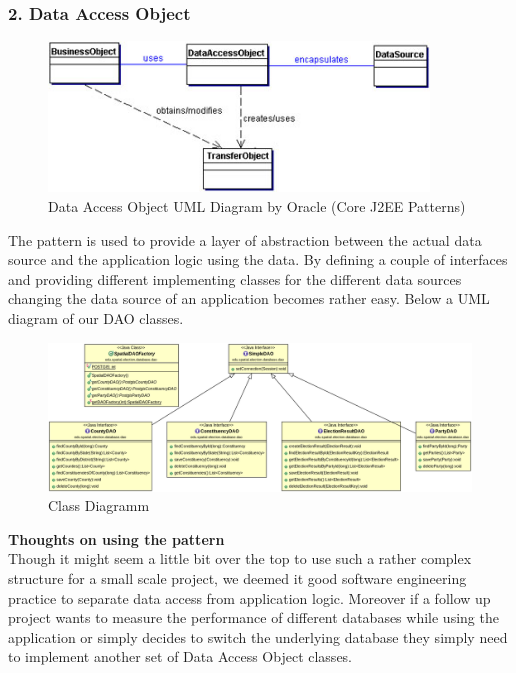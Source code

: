 \subsubsection{2. Data Access Object}\label{data-access-object}

\begin{figure}[htbp]
\centering
\includegraphics[width=0.9\textwidth]{../img/146804.jpg}
\caption{Data Access Object UML Diagram by Oracle (Core J2EE Patterns)}
\end{figure}

The pattern is used to provide a layer of abstraction between the actual
data source and the application logic using the data. By defining a
couple of interfaces and providing different implementing classes for
the different data sources changing the data source of an application
becomes rather easy. Below a UML diagram of our DAO classes.

\begin{figure}[htbp]
\centering
\includegraphics[width=1.2\textwidth]{../img/6CeJf06.png}
\caption{Class Diagramm}
\end{figure}

\textbf{Thoughts on using the pattern}\\Though it might seem a little
bit over the top to use such a rather complex structure for a small
scale project, we deemed it good software engineering practice to
separate data access from application logic. Moreover if a follow up
project wants to measure the performance of different databases while
using the application or simply decides to switch the underlying
database they simply need to implement another set of Data Access Object
classes.

